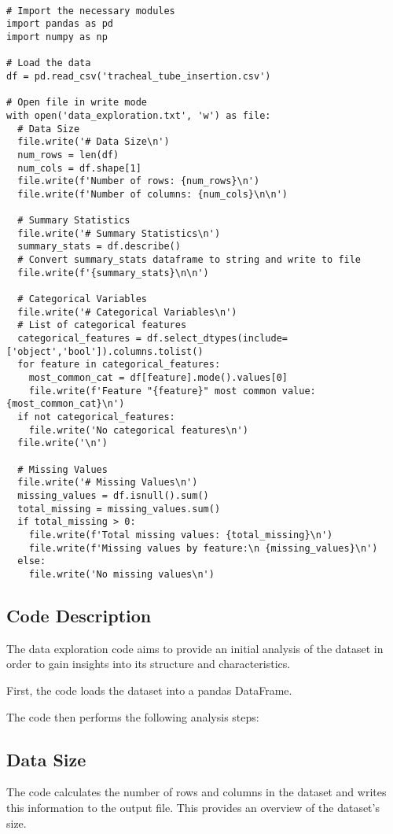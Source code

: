 \documentclass[11pt]{article}
\begin{document}
\begin{verbatim}

# Import the necessary modules
import pandas as pd
import numpy as np

# Load the data 
df = pd.read_csv('tracheal_tube_insertion.csv')

# Open file in write mode
with open('data_exploration.txt', 'w') as file:
  # Data Size
  file.write('# Data Size\n')
  num_rows = len(df)
  num_cols = df.shape[1]
  file.write(f'Number of rows: {num_rows}\n')
  file.write(f'Number of columns: {num_cols}\n\n')

  # Summary Statistics
  file.write('# Summary Statistics\n')
  summary_stats = df.describe()
  # Convert summary_stats dataframe to string and write to file
  file.write(f'{summary_stats}\n\n')

  # Categorical Variables
  file.write('# Categorical Variables\n')
  # List of categorical features
  categorical_features = df.select_dtypes(include=['object','bool']).columns.tolist()
  for feature in categorical_features:
    most_common_cat = df[feature].mode().values[0]
    file.write(f'Feature "{feature}" most common value: {most_common_cat}\n')
  if not categorical_features:
    file.write('No categorical features\n')
  file.write('\n')

  # Missing Values
  file.write('# Missing Values\n')
  missing_values = df.isnull().sum()
  total_missing = missing_values.sum()
  if total_missing > 0:
    file.write(f'Total missing values: {total_missing}\n')
    file.write(f'Missing values by feature:\n {missing_values}\n')
  else:
    file.write('No missing values\n')

\end{verbatim}

\subsection{Code Description}

The data exploration code aims to provide an initial analysis of the dataset in order to gain insights into its structure and characteristics. 

First, the code loads the dataset into a pandas DataFrame. 

The code then performs the following analysis steps:

\subsection{Data Size}
The code calculates the number of rows and columns in the dataset and writes this information to the output file. This provides an overview of the dataset's size.
\end{document}
